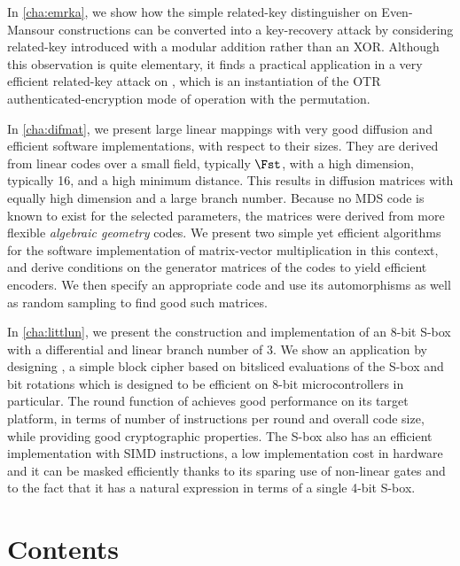 In \autoref{cha:emrka}, we show how the simple related-key distinguisher on Even-Mansour constructions can be converted into a
key-recovery attack by considering related-key introduced with a modular addition rather than an XOR. Although this observation
is quite elementary, it finds a practical application in a very efficient related-key attack on \proestotr, which is an instantiation
of the OTR authenticated-encryption mode of operation with the \proest permutation.


In \autoref{cha:difmat}, we present large linear mappings with very good diffusion and efficient software implementations,
with respect to their sizes. They are derived from linear codes over a small field, typically $\Fst$, with a high dimension,
typically 16, and a high minimum distance. This results in
diffusion matrices with equally high dimension and a large branch number.
Because no MDS code is known to exist for the selected parameters, the matrices were derived from more flexible \emph{algebraic geometry} codes.
We present two simple yet efficient algorithms for the software implementation of matrix-vector multiplication in this context, and derive
conditions on the generator matrices of the codes to yield efficient encoders. We then specify an appropriate code and use its automorphisms as well as random sampling
to find good such matrices.

In \autoref{cha:littlun}, we present
the construction and implementation of an 8-bit S-box with a differential and linear branch number of 3.
We show an application by designing \littlunpride, a simple block cipher
based on bitsliced evaluations of the S-box and bit rotations which is designed to be efficient on 8-bit microcontrollers in particular.
The round function of \fly achieves good performance on its target platform, in terms of number of instructions per round and overall
code size, while providing good cryptographic properties.
The S-box also has an efficient implementation with SIMD instructions, a low implementation cost in hardware
and it can be masked efficiently thanks to its sparing use of non-linear gates and to the fact that it has a natural expression in
terms of a single 4-bit S-box.

\cleardoublepage
\chapter*{Contents}
\parttoc



